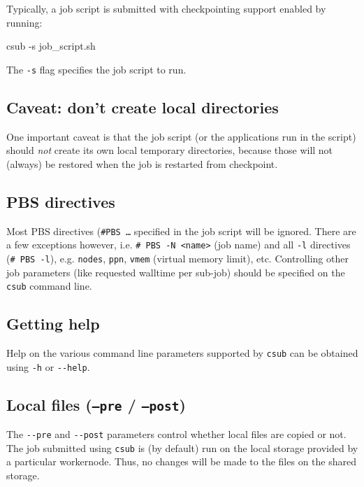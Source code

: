 Typically, a job script is submitted with checkpointing support enabled by running:

\begin{prompt}
csub -s job_script.sh
\end{prompt}

The  \lstinline|-s| flag specifies the job script to run.

\subsection{Caveat: don't create local directories}

One important caveat is that the job script (or the applications run in the script)
should \emph{not} create its own local temporary directories, because those will not (always)
be restored when the job is restarted from checkpoint.

\subsection{PBS directives}

Most PBS directives (\texttt{\#PBS \ldots} specified in the job script will be ignored.
There are a few exceptions however, i.e. \lstinline|# PBS -N <name>| (job name)
and all \lstinline|-l| directives (\lstinline|# PBS -l|), e.g. \lstinline|nodes|,
\lstinline|ppn|, \lstinline|vmem| (virtual memory limit), etc.
Controlling other job parameters (like requested walltime per sub-job) should be
specified on the \lstinline|csub| command line.

\subsection{Getting help}

Help on the various command line parameters supported by \lstinline|csub| can be
obtained using \lstinline|-h| or \lstinline|--help|.

\subsection{Local files (\texttt{--pre} / \texttt{--post})}

The \lstinline|--pre| and \lstinline|--post| parameters control whether local files
are copied or not. The job submitted using \lstinline|csub| is (by default) run on the local
storage provided by a particular workernode. Thus, no changes will be made to the
files on the shared storage.

